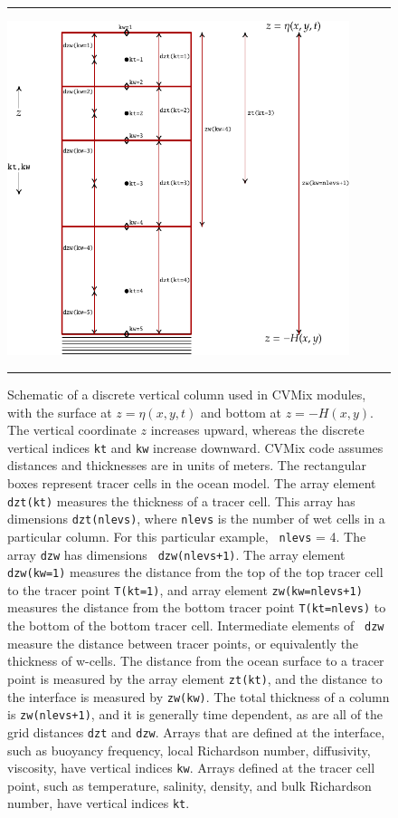 \begin{figure}[h!t]
\rule{\textwidth}{0.005in}
\begin{center}
\includegraphics[angle=0,width=10cm]{./mfpic_figs/cvmix_discrete_vertical.pdf}
\caption[Discrete vertical column for CVMix modules]{\sf Schematic of
  a discrete vertical column used in CVMix modules, with the surface
  at $z=\eta(x,y,t)$ and bottom at $z=-H(x,y)$.  The vertical
  coordinate $z$ increases upward, whereas the discrete vertical
  indices {\tt kt} and {\tt kw} increase downward.  CVMix code assumes
  distances and thicknesses are in units of meters. The rectangular
  boxes represent tracer cells in the ocean model.  The array element
  {\tt dzt(kt)} measures the thickness of a tracer cell. This array
  has dimensions {\tt dzt(nlevs)}, where {\tt nlevs} is the number of
  wet cells in a particular column.  For this particular example, {\tt
    nlevs} = 4.  The array {\tt dzw} has dimensions {\tt
    dzw(nlevs+1)}.  The array element {\tt dzw(kw=1)} measures the
  distance from the top of the top tracer cell to the tracer point
  {\tt T(kt=1)}, and array element {\tt zw(kw=nlevs+1)} measures the
  distance from the bottom tracer point {\tt T(kt=nlevs)} to the
  bottom of the bottom tracer cell.  Intermediate elements of {\tt
    dzw} measure the distance between tracer points, or equivalently
  the thickness of w-cells.  The distance from the ocean surface to a
  tracer point is measured by the array element {\tt zt(kt)}, and the
  distance to the interface is measured by {\tt zw(kw)}.  The total
  thickness of a column is {\tt zw(nlevs+1)}, and it is generally time
  dependent, as are all of the grid distances {\tt dzt} and {\tt dzw}.
  Arrays that are defined at the interface, such as buoyancy
  frequency, local Richardson number, diffusivity, viscosity, have
  vertical indices {\tt kw}.  Arrays defined at the tracer cell point,
  such as temperature, salinity, density, and bulk Richardson number,
  have vertical indices {\tt kt}.}
\label{fig:cvmix_discrete_vertical}
\end{center}
\rule{\textwidth}{0.005in}
\end{figure}


